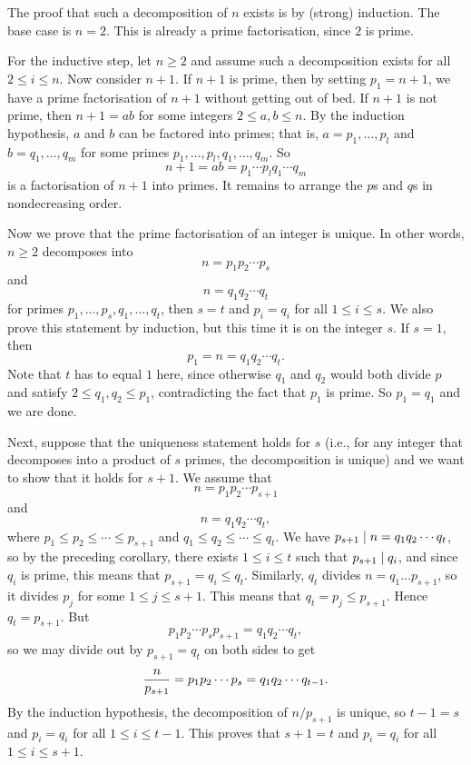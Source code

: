 \proof The proof that such a decomposition of $n$ exists is
by (strong) induction. The base case is $n=2$. This is already a prime factorisation, since $2$ is prime.

For the inductive step, let $n\ge 2$ and assume such a decomposition exists
for all $2\le i\le n$. Now consider $n+1$. If $n+1$ is prime, then by setting $p_1 = n+1$,
we have a prime factorisation of $n+1$ without getting out of bed. If $n+1$ is not prime,
then $n+1 = ab$ for some integers $2\le a,b\le n$. By the induction hypothesis, $a$ and $b$
can be factored into primes; that is, $a = p_1,\ldots,p_l$
and $b = q_1,\ldots,q_m$ for some primes $p_1,\ldots,p_l,q_1,\ldots,q_m$. So
$$n+1 = ab = p_1\cdots p_l q_1\cdots q_m$$
is a factorisation of $n+1$ into primes.
It remains to arrange the $p$s and $q$s in nondecreasing order.

Now we prove that the prime factorisation of an integer is unique. In other words, $n\ge 2$
decomposes into
$$n = p_1p_2\cdots p_s$$
and
$$n = q_1q_2\cdots q_t$$
for primes $p_1,\ldots,p_s,q_1,\ldots,q_t$,
then $s=t$ and $p_i = q_i$ for all $1\le i\le s$. We also prove this statement by induction,
but this time it is on the integer $s$. If $s=1$, then
$$p_1 = n = q_1q_2\cdots q_t.$$
Note that $t$ has to equal $1$ here, since otherwise $q_1$ and $q_2$ would both
divide $p$ and satisfy $2\le q_1,q_2\le p_1$, contradicting the fact that $p_1$ is prime.
So $p_1 = q_1$ and we are done.

Next, suppose that the uniqueness
statement holds for $s$ (i.e., for any integer that decomposes
into a product of $s$ primes, the decomposition is unique) and we want to show that it holds
for $s+1$. We assume that
$$n = p_1p_2\cdots p_{s+1}$$
and
$$n = q_1q_2\cdots q_t,$$
where $p_1\le p_2\le \cdots \le p_{s+1}$ and $q_1\le q_2\le\cdots\le q_t$. We
have $p_{s+1}\mid n = q_1q_2\cdots q_t$, so by the preceding corollary, there
exists $1\le i\le t$ such that $p_{s+1}\mid q_i$, and since $q_i$ is prime, this means
that $p_{s+1} = q_i\le q_t$. Similarly, $q_t$ divides $n = q_1\ldots p_{s+1}$, so it
divides $p_j$ for some $1\le j\le s+1$. This means that $q_t = p_j \le p_{s+1}$. Hence
$q_t = p_{s+1}$. But
$$p_1p_2 \cdots p_s p_{s+1} = q_1q_2 \cdots q_t,$$
so we may divide out by $p_{s+1} = q_t$ on both sides to get
$${n\over p_{s+1}} = p_1p_2\cdots p_s = q_1 q_2 \cdots q_{t-1}.$$
By the induction hypothesis, the decomposition of $n/p_{s+1}$ is unique, so $t-1 = s$
and $p_i = q_i$ for all $1\le i\le t-1$. This proves that $s+1 = t$ and
$p_i = q_i$ for all $1\le i\le s+1$.\slug

